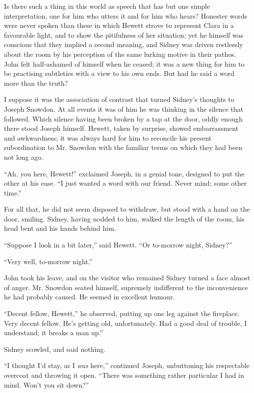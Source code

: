Is there such a thing in this world as speech that has but one simple
interpretation, one for him who utters it and for him who hears?
Honester words were never spoken than these in which Hewett strove to
represent Clara in a favourable light, and to show the pitifulness of
her situation; yet he himself was conscious that they implied a second
meaning, and Sidney was driven restlessly about the room by his
perception of the same lurking motive in their pathos. John felt
half-ashamed of himself when he ceased; it was a new thing for him to be
practising subtleties with a view to his own ends. But had he said a
word more than the truth?

I suppose it was the association of contrast that turned Sidney's
thoughts to Joseph Snowdon. At all events it was of him he was
{}thinking in the silence that followed. Which silence having been
broken by a tap at the door, oddly enough there stood Joseph himself.
Hewett, taken by surprise, showed embarrassment and awkwardness; it was
always hard for him to reconcile his present subordination to Mr.
Snowdon with the familiar terms on which they had been not long ago.

``Ah, you here, Hewett!'' exclaimed Joseph, in a genial tone, designed
to put the other at his ease. ``I just wanted a word with our friend.
Never mind; some other time.''

For all that, he did not seem disposed to withdraw, but stood with a
hand on the door, smiling. Sidney, having nodded to him, walked the
length of the room, his head bent and his hands behind him.

``Suppose I look in a bit later,'' said Hewett. ``Or to-morrow night,
Sidney?''

``Very well, to-morrow night.''

John took his leave, and on the visitor who remained Sidney turned a
face almost of anger. Mr. Snowdon seated himself, supremely indifferent
to the inconvenience he had probably caused. He seemed in excellent
humour.

``Decent fellow, Hewett,'' he observed, {}putting up one leg against the
fireplace. Very decent fellow. He's getting old, unfortunately. Had a
good deal of trouble, I understand; it breaks a man up.''

Sidney scowled, and said nothing.

``I thought I'd stay, as I \emph{was} here,'' continued Joseph,
unbuttoning his respectable overcoat and throwing it open. ``There was
something rather particular I had in mind. Won't you sit down?''

